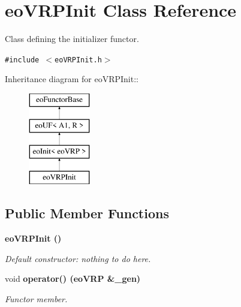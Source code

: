\section{eo\-VRPInit Class Reference}
\label{classeo_v_r_p_init}
Class defining the initializer functor.  


{\tt \#include $<$eo\-VRPInit.h$>$}

Inheritance diagram for eo\-VRPInit::\begin{figure}[H]
\begin{center}
\leavevmode
\includegraphics[height=4cm]{classeo_v_r_p_init}
\end{center}
\end{figure}
\subsection*{Public Member Functions}
\begin{CompactItemize}
\item 
\bf{eo\-VRPInit} ()\label{classeo_v_r_p_init_a620d4fa1b930b1fd8b491f1ef5c72fd}

\begin{CompactList}\small\item\em Default constructor: nothing to do here. \item\end{CompactList}\item 
void \bf{operator()} (\bf{eo\-VRP} \&\_\-gen)
\begin{CompactList}\small\item\em Functor member. \item\end{CompactList}\end{CompactItemize}
